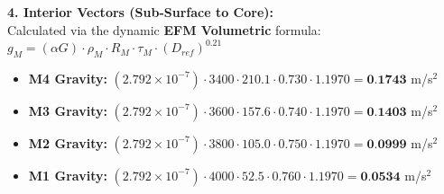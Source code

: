 \documentclass[11pt, a4paper]{article}
\begin{document}
  \vspace{0.5em}
  \noindent \textbf{4. Interior Vectors (Sub-Surface to Core):} \\[0.5em]
  \hspace*{1em} Calculated via the dynamic \textbf{EFM Volumetric} formula: $g_M = (\alpha G) \cdot \rho_{M} \cdot R_M \cdot \tau_M \cdot (D_{ref})^{0.21}$
  \begin{itemize}
    \item \textbf{M4 Gravity:} $(2.792 \times 10^{-7}) \cdot 3400 \cdot 210.1 \cdot 0.730 \cdot 1.1970 = \textbf{0.1743}$ m/s$^2$
    \item \textbf{M3 Gravity:} $(2.792 \times 10^{-7}) \cdot 3600 \cdot 157.6 \cdot 0.740 \cdot 1.1970 = \textbf{0.1403}$ m/s$^2$
    \item \textbf{M2 Gravity:} $(2.792 \times 10^{-7}) \cdot 3800 \cdot 105.0 \cdot 0.750 \cdot 1.1970 = \textbf{0.0999}$ m/s$^2$
    \item \textbf{M1 Gravity:} $(2.792 \times 10^{-7}) \cdot 4000 \cdot 52.5 \cdot 0.760 \cdot 1.1970 = \textbf{0.0534}$ m/s$^2$
  \end{itemize}
\end{document}
